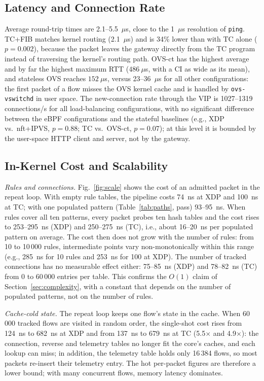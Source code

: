 \documentclass[conference]{IEEEtran}
\begin{document}
\subsection{Latency and Connection Rate}
\label{sec:latency}
Average round-trip times are 2.1--5.5~$\mu$s, close to the 1~$\mu$s
resolution of \texttt{ping}. TC+FIB matches kernel routing (2.1~$\mu$s) and is
34\% lower than with TC alone ($p=0.002$), because the packet
leaves the gateway directly from the TC program instead of traversing the
kernel's routing path. OVS-ct has the highest average and by far the highest
maximum RTT ($486~\mu$s, with a CI as wide as its mean), and stateless OVS
reaches $152~\mu$s, versus 23--36~$\mu$s for all other configurations: the
first packet of a flow misses the OVS kernel cache and is handled by
\texttt{ovs-vswitchd} in user space. The new-connection rate through the VIP
is 1027--1319 connections/s for all load-balancing configurations, with no
significant difference between the eBPF configurations and the stateful
baselines (e.g., XDP vs.\ nft+IPVS, $p=0.88$; TC vs.\ OVS-ct, $p=0.07$); at
this level it is bounded by the user-space HTTP client and server, not by the
gateway.

\subsection{In-Kernel Cost and Scalability}
\label{sec:kernel-cost}
\textit{Rules and connections.} Fig.~\ref{fig:scale} shows the cost of an
admitted packet in the repeat loop. With empty rule tables, the pipeline costs
74~ns at XDP and 100~ns at TC; with one populated pattern
(Table~\ref{tab:paths}, pass) 93--95~ns. When rules cover all ten patterns,
every packet probes ten hash tables and the cost rises to 253--295~ns (XDP)
and 250--275~ns (TC), i.e., about 16--20~ns per populated pattern on average. The cost
then does not grow with the number of rules: from 10 to 10\,000 rules,
intermediate points vary non-monotonically within this range (e.g., 285~ns for
10 rules and 253~ns for 100 at XDP). The number of tracked connections has no
measurable effect either: 75--85~ns (XDP) and 78--82~ns (TC) from 0 to
60\,000 entries per table. This confirms the $O(1)$ claim of
Section~\ref{sec:complexity}, with a constant that depends on the number of
populated patterns, not on the number of rules.

\textit{Cache-cold state.} The repeat loop keeps one flow's state in the
cache. When 60\,000 tracked flows are visited in random order, the
single-shot cost rises from 124~ns to 682~ns at XDP and from 137~ns to 679~ns
at TC (5.5$\times$ and 4.9$\times$): the connection, reverse and telemetry
tables no longer fit the core's caches, and each lookup can miss; in
addition, the telemetry table holds only 16\,384 flows, so most packets
re-insert their telemetry entry. The hot
per-packet figures are therefore a lower bound; with many concurrent flows,
memory latency dominates.
\end{document}
